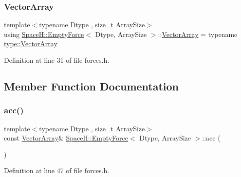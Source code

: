 \subsubsection{\texorpdfstring{Vector\+Array}{VectorArray}}
{\footnotesize\ttfamily template$<$typename Dtype , size\+\_\+t Array\+Size$>$ \\
using \mbox{\hyperlink{struct_space_h_1_1_empty_force}{Space\+H\+::\+Empty\+Force}}$<$ Dtype, Array\+Size $>$\+::\mbox{\hyperlink{struct_space_h_1_1_empty_force_a06ad868879a6fa5def9c7f9fd75fffde}{Vector\+Array}} =  typename \mbox{\hyperlink{struct_space_h_1_1_proto_type_a622b8e122b33bb4966a02299fb7b82d6}{type\+::\+Vector\+Array}}}



Definition at line 31 of file forces.\+h.



\subsection{Member Function Documentation}
\mbox{\label{struct_space_h_1_1_empty_force_a1547f680e4dbf0cb9fc7e945872928e2}} 
\subsubsection{\texorpdfstring{acc()}{acc()}\hspace{0.1cm}{\footnotesize\ttfamily [1/2]}}
{\footnotesize\ttfamily template$<$typename Dtype , size\+\_\+t Array\+Size$>$ \\
const \mbox{\hyperlink{struct_space_h_1_1_empty_force_a06ad868879a6fa5def9c7f9fd75fffde}{Vector\+Array}}\& \mbox{\hyperlink{struct_space_h_1_1_empty_force}{Space\+H\+::\+Empty\+Force}}$<$ Dtype, Array\+Size $>$\+::acc (\begin{DoxyParamCaption}{ }\end{DoxyParamCaption})\hspace{0.3cm}{\ttfamily [inline]}}



Definition at line 47 of file forces.\+h.

\mbox{\label{struct_space_h_1_1_empty_force_aef51b27e9c50c23783619e82dca0b1e6}} 
